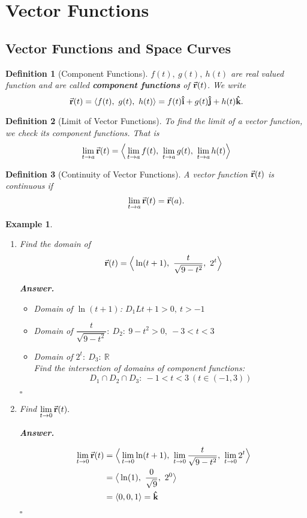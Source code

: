 \documentclass[12pt,a4paper]{article}
\newtheorem{df}{Definition}[subsection]
\newtheorem{eg}{Example}[subsection]
\newenvironment*{ans}{\par\indent\textbf{\textit{Answer. }}\par}{\par\hfill{$\square$}\par}
\def\R{{\mathbb{R}}}
\def\vecr{\va{{\textbf{r}}}}
\def\veci{\vu{\boldsymbol{\textbf{i}}}}
\def\vecj{\vu{\boldsymbol{\textbf{j}}}}
\def\veck{\vu{\boldsymbol{\textbf{k}}}}
\begin{document}
\newpage
\section{Vector Functions}
\subsection{Vector Functions and Space Curves}
\begin{df}[Component Functions]
	$f(t),\ g(t),\ h(t)$ are real valued function and are called \textbf{component functions} of $\vecr(t)$. We write \[\vecr(t)=\langle f(t),\ g(t),\ h(t)\rangle=f(t)\veci+g(t)\vecj+h(t)\veck.\]		
\end{df}
\begin{df}[Limit of Vector Functions]
	To find the limit of a vector function, we check its component functions. That is \[\lim_{t\to a}\vecr(t)=\Big\langle\lim_{t\to a}f(t),\ \lim_{t\to a}g(t),\ \lim_{t\to a}h(t)\Big\rangle\]	
\end{df}
\begin{df}[Continuity of Vector Functions]
	A vector function $\vecr(t)$ is continuous if \[\lim_{t\to a}\vecr(t)=\vecr(a).\]	
\end{df}
\begin{eg}
	\begin{enumerate}
		\item Find the domain of \[\vecr(t)=\Big\langle\ln(t+1),\ \frac{t}{\sqrt{9-t^2}},\ 2^t\Big\rangle\]
		\begin{ans}
			\begin{itemize}
				\item Domain of $\ln(t+1)$: $D_1L t+1>0,\ t>-1$
				\item Domain of $\dfrac{t}{\sqrt{9-t^2}}:\ D_2:\ 9-t^2>0,\ -3<t<3$
				\item Domain of $2^t:\ D_3:\ \R$\\
				Find the intersection of domains of component functions: \[D_1\cap D_2\cap D_3:\ -1<t<3\ (t\in(-1,3))\]
			\end{itemize}	
		\end{ans}
		\item Find $\displaystyle\lim_{t\to0}\vecr(t).$
		\begin{ans}
			\[\begin{aligned}
			\lim_{t\to0}\vecr(t)&=\Big\langle\lim_{t\to0}\ln(t+1),\ \lim_{t\to0}\frac{t}{\sqrt{9-t^2}},\ \lim_{t\to0}2^t\Big\rangle\\
			&=\big\langle\ln(1),\ \frac{0}{\sqrt{9}},\ 2^0\big\rangle\\
			&=\langle0,0,1\rangle=\veck
			\end{aligned}\]
		\end{ans}
	\end{enumerate}	
\end{eg}
\end{document}

